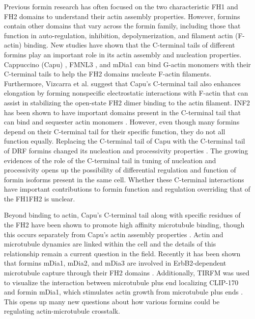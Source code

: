 Previous formin research has often focused on the two characteristic FH1 and FH2 domains to understand their actin assembly properties. However, formins contain other domains that vary across the formin family, including those that function in auto-regulation, inhibition, depolymerization, and filament actin (F-actin) binding. New studies have shown that the C-terminal tails of different formins play an important role in its actin assembly and nucleation properties. Cappuccino (Capu) \citep{vizcarra_role_2014}, FMNL3 \citep{heimsath_c_2012}, and mDia1 \citep{gould_formin_2011} can bind G-actin monomers with their C-terminal tails to help the FH2 domains nucleate F-actin filaments. Furthermore, Vizcarra et al. suggest that Capu's C-terminal tail also enhances elongation by forming nonspecific electrostatic interactions with F-actin that can assist in stabilizing the open-state FH2 dimer binding to the actin filament. INF2 has been shown to have important domains present in the C-terminal tail that can bind and sequester actin monomers \citep{chhabra_inf2_2006}. However, even though many formins depend on their C-terminal tail for their specific function, they do not all function equally. Replacing the C-terminal tail of Capu with the C-terminal tail of DRF formins changed its nucleation and processivity properties \citep{vizcarra_role_2014}. The growing evidences of the role of the C-terminal tail in tuning of nucleation and processivity opens up the possibility of differential regulation and function of formin isoforms present in the same cell. Whether these C-terminal interactions have important contributions to formin function and regulation overriding that of the FH1FH2 is unclear. 

Beyond binding to actin, Capu's C-terminal tail along with specific residues of the FH2 have been shown to promote high affinity microtubule binding, though this occurs separately from Capu's actin assembly properties \citep{roth-johnson_interaction_2014}. Actin and microtubule dynamics are linked within the cell and the details of this relationship remain a current question in the field. Recently it has been shown that formins mDia1, mDia2, and mDia3 are involved in ErbB2-dependent microtubule capture through their FH2 domains \citep{daou_essential_2014}. Additionally, TIRFM was used to visualize the interaction between microtubule plus end localizing CLIP-170 and formin mDia1, which stimulates actin growth from microtubule plus ends \citep{henty-ridilla_accelerated_2016}. This opens up many new questions about how various formins could be regulating actin-microtubule crosstalk. 


